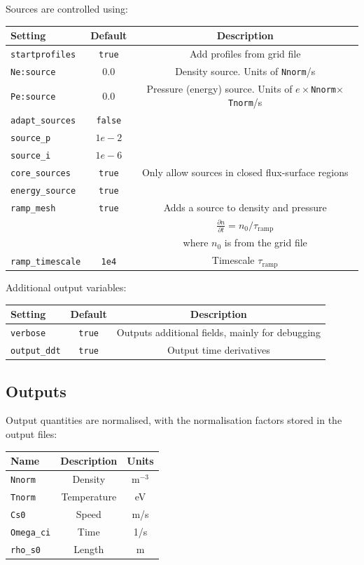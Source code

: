 \documentclass[12pt,a4paper]{article}
\begin{document}
Sources are controlled using:
\begin{center}
\begin{tabular}{l c c}
  Setting & Default & Description \\
  \hline
  \texttt{startprofiles} & \texttt{true} & Add profiles from grid file \\
  \texttt{Ne:source} & $0.0$ & Density source. Units of \texttt{Nnorm}/s \\
  \texttt{Pe:source} & $0.0$ & Pressure (energy) source. Units of $e\times$\texttt{Nnorm}$\times$\texttt{Tnorm}/s\\
  \texttt{adapt\_sources} & \texttt{false} &  \\
  \texttt{source\_p} & $1e-2$ &  \\
  \texttt{source\_i} & $1e-6$ &  \\
  \texttt{core\_sources} & \texttt{true} & Only allow sources in closed flux-surface regions \\
  \texttt{energy\_source} & \texttt{true} &  \\
  \texttt{ramp\_mesh} & \texttt{true} &  Adds a source to density and pressure \\
  & & $\frac{\partial n}{\partial t} = n_0 / \tau_\textrm{ramp}$ \\
  & & where $n_0$ is from the grid file \\
  \texttt{ramp\_timescale} & \texttt{1e4} & Timescale $\tau_\textrm{ramp}$\\
  \hline
\end{tabular}
\end{center}

Additional output variables:
\begin{center}
\begin{tabular}{l c c}
  Setting & Default & Description \\
  \hline
  \texttt{verbose} & \texttt{true} & Outputs additional fields, mainly for debugging\\
  \texttt{output\_ddt} & \texttt{true} & Output time derivatives \\
  \hline
\end{tabular}
\end{center}

\subsection{Outputs}
\label{sec:output}

Output quantities are normalised, with the normalisation factors stored in the output files:
\begin{center}
\begin{tabular}{l c c}
  Name & Description & Units \\
  \hline
  \texttt{Nnorm}  & Density  & m$^{-3}$\\
  \texttt{Tnorm}  & Temperature  & eV\\
  \texttt{Cs0}  & Speed  & m/s \\
  \texttt{Omega\_ci} & Time & 1/s \\
  \texttt{rho\_s0} & Length & m \\
  \hline
\end{tabular}
\end{center}
\end{document}
